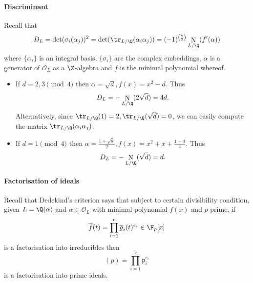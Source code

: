\documentclass[a4paper]{article}
\renewcommand*{\O}{\mathcal{O}}
\DeclareMathOperator{\n}{N}
\newcommand*{\red}[1]{\overline{#1}}%
\begin{document}
\paragraph{Discriminant}

Recall that
\[
  D_L
  = \det (\sigma_i(\alpha_j))^2
  = \det (\tr_{L/\Q}(\alpha_i\alpha_j))
  = (-1)^{\binom{n}{2}}\n_{L/\Q}(f'(\alpha))
\]
where \(\{\alpha_i\}\) is an integral basis, \(\{\sigma_i\}\) are the complex embeddings, \(\alpha\) is a generator of \(\O_L\) as a \(\Z\)-algebra and \(f\) is the minimal polynomial whereof.

\begin{itemize}
\item If \(d = 2, 3 \pmod 4\) then \(\alpha = \sqrt d, f(x) = x^2 - d\). Thus
  \[
    D_L = -\n_{L/\Q}(2\sqrt d) = 4d.
  \]
  Alternatively, since \(\tr_{L/\Q}(1) = 2, \tr_{L/\Q}(\sqrt d) = 0\), we can easily compute the matrix \(\tr_{L/\Q}(\alpha_i\alpha_j)\).
\item If \(d = 1 \pmod 4\) then \(\alpha = \frac{1 + \sqrt d}{2}, f(x) = x^2 + x + \frac{1 - d}{4}\). Thus
  \[
    D_L = -\n_{L/\Q}(\sqrt d) = d.
  \]
\end{itemize}

\paragraph{Factorisation of ideals}

Recall that Dedekind's criterion says that subject to certain divisibility condition, given \(L = \Q(\alpha)\) and \(\alpha \in \O_L\) with minimal polynomial \(f(x)\) and \(p\) prime, if
\[
  \red f(t) = \prod_{i = 1}^r \red g_i(t)^{e_i} \in \F_p[x]
\]
is a factorisation into irreducibles then
\[
  (p) = \prod_{i = 1}^r \mathfrak{p}_i^{e_i}
\]
is a factorisation into prime ideals.
\end{document}
